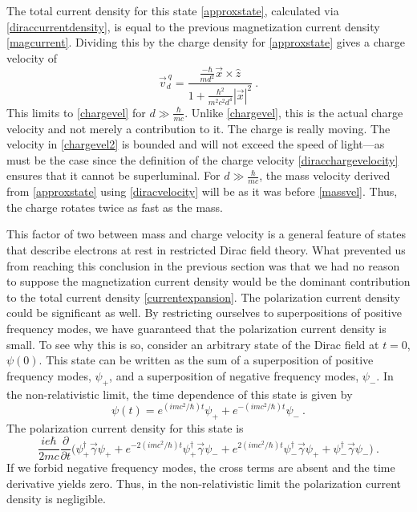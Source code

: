 \documentclass[12pt,secnumarabic,amsmath,amssymb,balancelastpage,nofootinbib]{article}
\begin{document}
The total current density for this state \eqref{approxstate}, calculated via \eqref{diraccurrentdensity}, is equal to the previous magnetization current density \eqref{magcurrent}.  Dividing this by the charge density for \eqref{approxstate} gives a charge velocity of
\begin{equation}
\vec{v}_d^{\:q}=\frac{\frac{-\hbar}{m d^2}\vec{x}\times\hat{z}}{1+\frac{\hbar^2}{m^2 c^2 d^4}|\vec{x}|^2}\ .
\label{chargevel2}
\end{equation}
This limits to \eqref{chargevel} for $d \gg \frac{\hbar}{m c}$.  Unlike \eqref{chargevel}, this is the actual charge velocity and not merely a contribution to it.  The charge is really moving.  The velocity in \eqref{chargevel2} is bounded and will not exceed the speed of light---as must be the case since the definition of the charge velocity \eqref{diracchargevelocity} ensures that it cannot be superluminal.  For $d \gg \frac{\hbar}{m c}$, the mass velocity derived from \eqref{approxstate} using \eqref{diracvelocity} will be as it was before \eqref{massvel}.  Thus, the charge rotates twice as fast as the mass.

This factor of two between mass and charge velocity is a general feature of states that describe electrons at rest in restricted Dirac field theory.  What prevented us from reaching this conclusion in the previous section was that we had no reason to suppose the magnetization current density would be the dominant contribution to the total current density \eqref{currentexpansion}.  The polarization current density could be significant as well.  By restricting ourselves to superpositions of positive frequency modes, we have guaranteed that the polarization current density is small.  To see why this is so, consider an arbitrary state of the Dirac field at $t=0$, $\psi(0)$.  This state can be written as the sum of a superposition of positive frequency modes, $\psi_+$, and a superposition of negative frequency modes, $\psi_-$.  In the non-relativistic limit, the time dependence of this state is given by
\begin{equation}
\psi(t)=e^{(i m c^2 / \hbar) t}\psi_++e^{-(i m c^2 / \hbar) t}\psi_-\ .
\end{equation}
The polarization current density for this state is
\begin{equation}
\frac{i e\hbar}{2 m c}\frac{\partial}{\partial t}\big(\psi_+^\dagger \vec{\gamma} \psi_++e^{-2(i m c^2 / \hbar) t}\psi_+^\dagger \vec{\gamma} \psi_-+e^{2(i m c^2 / \hbar) t}\psi_-^\dagger \vec{\gamma} \psi_++\psi_-^\dagger \vec{\gamma} \psi_-\big)\ .
\end{equation}
If we forbid negative frequency modes, the cross terms are absent and the time derivative yields zero.  Thus, in the non-relativistic limit the polarization current density is negligible.
\end{document}
